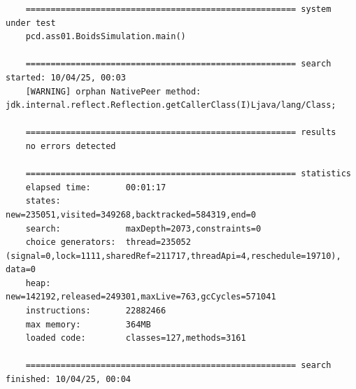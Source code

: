 \documentclass[a4paper,12pt]{report}
\begin{document}
\begin{verbatim}
    ====================================================== system under test
    pcd.ass01.BoidsSimulation.main()

    ====================================================== search started: 10/04/25, 00:03
    [WARNING] orphan NativePeer method: jdk.internal.reflect.Reflection.getCallerClass(I)Ljava/lang/Class;

    ====================================================== results
    no errors detected

    ====================================================== statistics
    elapsed time:       00:01:17
    states:             new=235051,visited=349268,backtracked=584319,end=0
    search:             maxDepth=2073,constraints=0
    choice generators:  thread=235052 (signal=0,lock=1111,sharedRef=211717,threadApi=4,reschedule=19710), data=0
    heap:               new=142192,released=249301,maxLive=763,gcCycles=571041
    instructions:       22882466
    max memory:         364MB
    loaded code:        classes=127,methods=3161

    ====================================================== search finished: 10/04/25, 00:04
\end{verbatim}
\end{document}
